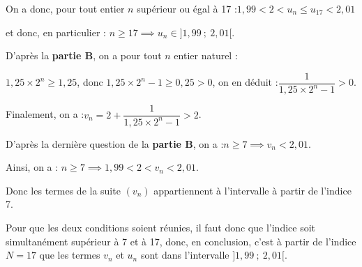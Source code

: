 \documentclass[10pt]{article}
\begin{document}
	On a donc, pour tout entier $n$ supérieur ou égal à 17 :\quad $ 1,99 < 2 < u_n \leqslant u_{17} < 2,01$

	et donc, en particulier : \quad $n\geqslant 17 \implies u_n \in ]1,99~;~2,01[$.

	D'après la \textbf{partie B}, on a pour tout $n$ entier naturel :

	$1,25\times 2^n \geqslant 1,25$, \quad donc \quad $1,25 \times 2^n - 1 \geqslant 0,25 > 0$,
	\quad on en déduit :\quad $\dfrac{1}{1,25\times 2^n - 1} > 0$.

	Finalement, on a :\quad $v_n = 2 + \dfrac{1}{1,25\times 2^n - 1} > 2$.

	D'après la dernière question de la \textbf{partie B}, on a :\quad $n \geqslant 7 \implies v_n < 2,01$.

	Ainsi, on a : $n \geqslant 7 \implies 1,99 < 2 < v_n < 2,01$.

	Donc les termes de la suite $(v_n)$ appartiennent à l'intervalle à partir de l'indice 7.

	Pour que les deux conditions soient réunies, il faut donc que l'indice soit simultanément supérieur à 7 et à 17, donc, en conclusion, c'est à partir de l'indice $N = 17$ que les termes $v_n$ et $u_n$ sont dans l'intervalle $]1,99 ~;~ 2,01[$.


	\bigskip
\end{document}
